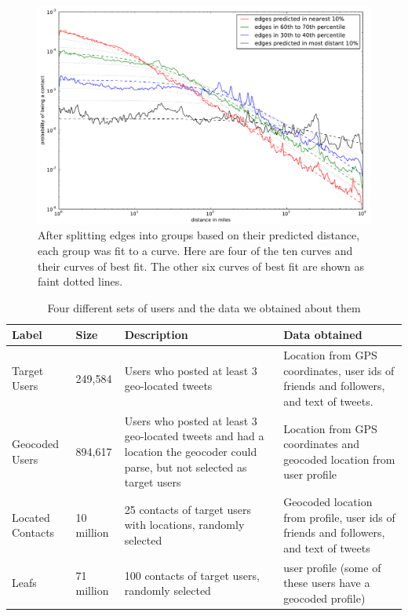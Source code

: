 \documentclass{sig-alternate}
\begin{document}
\begin{figure}[tb]
\centering
\includegraphics[width=.9\linewidth]{figures/vect_fit.pdf}
\caption{
After splitting edges into groups based on their predicted distance, each group
was fit to a curve.
%
Here are four of the ten curves and their curves of best
fit.
%
The other six curves of best fit are shown as faint dotted lines.}
\label{fig:NearProbFit}
\vspace{-2pt}
\end{figure}



\begin{table}[tb]
\scriptsize
\centering
\begin{tabular}{l l p{4cm} p{6cm}}
    Label & Size & Description & Data obtained \\
    \hline
    Target Users & 249,584 & Users who posted at least 3 geo-located tweets &
    Location from GPS coordinates, user ids of friends and followers,
    and text of tweets. \\
    Geocoded Users & 894,617 & Users who posted at least 3 geo-located tweets
    and had a location the geocoder could parse, but not selected as target users &
    Location from GPS coordinates and geocoded location from user profile \\
    Located Contacts & 10 million & 25 contacts of target users with locations, randomly selected &
    Geocoded location from profile, user ids of friends and followers, and text of tweets \\
    Leafs & 71 million & 100 contacts of target users, randomly selected &
    user profile (some of these users have a geocoded profile)\\
\end{tabular}
\caption{Four different sets of users and the data we obtained about them}
\label{tab:datasets}
\end{table}
\end{document}
